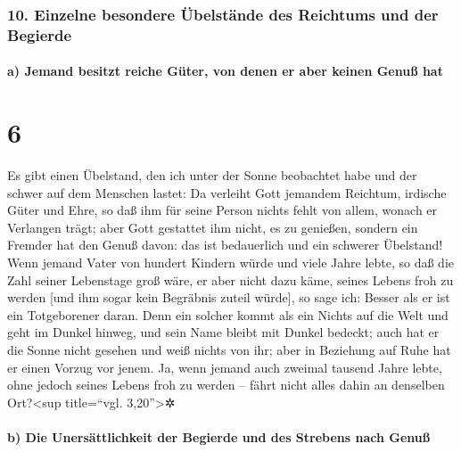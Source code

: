 \hypertarget{einzelne-besondere-uxfcbelstuxe4nde-des-reichtums-und-der-begierde}{%
\subsubsection{10. Einzelne besondere Übelstände des Reichtums und der
Begierde}\label{einzelne-besondere-uxfcbelstuxe4nde-des-reichtums-und-der-begierde}}

\hypertarget{a-jemand-besitzt-reiche-guxfcter-von-denen-er-aber-keinen-genuuxdf-hat}{%
\paragraph{a) Jemand besitzt reiche Güter, von denen er aber keinen
Genuß
hat}\label{a-jemand-besitzt-reiche-guxfcter-von-denen-er-aber-keinen-genuuxdf-hat}}

\hypertarget{section-5}{%
\section{6}\label{section-5}}

Es gibt einen Übelstand, den ich unter der Sonne
beobachtet habe und der schwer auf dem Menschen lastet: Da
verleiht Gott jemandem Reichtum, irdische Güter und Ehre, so daß ihm für
seine Person nichts fehlt von allem, wonach er Verlangen trägt; aber
Gott gestattet ihm nicht, es zu genießen, sondern ein Fremder hat den
Genuß davon: das ist bedauerlich und ein schwerer Übelstand!
Wenn jemand Vater von hundert Kindern würde und viele
Jahre lebte, so daß die Zahl seiner Lebenstage groß wäre, er aber nicht
dazu käme, seines Lebens froh zu werden {[}und ihm sogar kein Begräbnis
zuteil würde{]}, so sage ich: Besser als er ist ein Totgeborener daran.
Denn ein solcher kommt als ein Nichts auf die Welt und
geht im Dunkel hinweg, und sein Name bleibt mit Dunkel bedeckt;
auch hat er die Sonne nicht gesehen und weiß nichts von
ihr; aber in Beziehung auf Ruhe hat er einen Vorzug vor jenem.
Ja, wenn jemand auch zweimal tausend Jahre lebte, ohne
jedoch seines Lebens froh zu werden -- fährt nicht alles dahin an
denselben Ort?\textless sup title=``vgl. 3,20''\textgreater✲

\hypertarget{b-die-unersuxe4ttlichkeit-der-begierde-und-des-strebens-nach-genuuxdf}{%
\paragraph{b) Die Unersättlichkeit der Begierde und des Strebens nach
Genuß}\label{b-die-unersuxe4ttlichkeit-der-begierde-und-des-strebens-nach-genuuxdf}}

